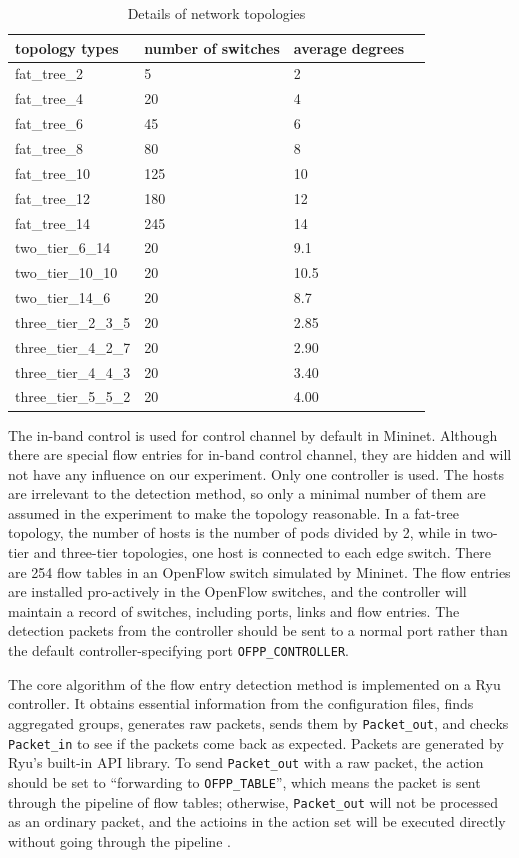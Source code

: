 \begin{table}[H]
\centering
\caption{Details of network topologies}
\begin{tabular}{|l|l|l|l|}
\hline topology types & number of switches & average degrees \\
\hline
\hline fat\_tree\_2 & 5 & 2 \\
\hline fat\_tree\_4 & 20 & 4 \\
\hline fat\_tree\_6 & 45 & 6 \\
\hline fat\_tree\_8 & 80 & 8 \\
\hline fat\_tree\_10 & 125 & 10 \\
\hline fat\_tree\_12 & 180 & 12 \\
\hline fat\_tree\_14 & 245 & 14 \\
\hline two\_tier\_6\_14 & 20 & 9.1 \\
\hline two\_tier\_10\_10 & 20 & 10.5 \\
\hline two\_tier\_14\_6 & 20 & 8.7 \\
\hline three\_tier\_2\_3\_5 & 20 & 2.85 \\
\hline three\_tier\_4\_2\_7 & 20 & 2.90 \\
\hline three\_tier\_4\_4\_3 & 20 & 3.40 \\
\hline three\_tier\_5\_5\_2 & 20 & 4.00 \\
\hline 
\end{tabular}
\label{table:network_env}
\end{table}

The in-band control is used for control channel by default in Mininet. Although there are special flow entries for in-band control channel, they are hidden and will not have any influence on our experiment. Only one controller is used. The hosts are irrelevant to the detection method, so only a minimal number of them are assumed in the experiment to make the topology reasonable. In a fat-tree topology, the number of hosts is the number of pods divided by 2, while in two-tier and three-tier topologies, one host is connected to each edge switch. There are 254 flow tables in an OpenFlow switch simulated by Mininet. The flow entries are installed pro-actively in the OpenFlow switches, and the controller will maintain a record of switches, including ports, links and flow entries. The detection packets from the controller should be sent to a normal port rather than the default controller-specifying port \texttt{OFPP\_CONTROLLER}.

The core algorithm of the flow entry detection method is implemented on a Ryu controller. It obtains essential information from the configuration files, finds aggregated groups, generates raw packets, sends them by \texttt{Packet\_out}, and checks \texttt{Packet\_in} to see if the packets come back as expected. Packets are generated by Ryu's built-in API library. To send \texttt{Packet\_out} with a raw packet, the action should be set to ``forwarding to \texttt{OFPP\_TABLE}'', which means the packet is sent through the pipeline of flow tables; otherwise, \texttt{Packet\_out} will not be processed as an ordinary packet, and the actioins in the action set will be executed directly without going through the pipeline \cite{PACKETOUT}. 

